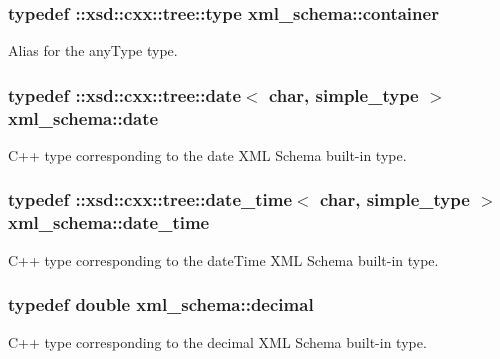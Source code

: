 \subsubsection[{container}]{\setlength{\rightskip}{0pt plus 5cm}typedef \+::xsd\+::cxx\+::tree\+::type {\bf xml\+\_\+schema\+::container}}\label{namespacexml__schema_a395f5179c5fc4643909d66e9ff28d8ca}


Alias for the any\+Type type. 

\hypertarget{namespacexml__schema_ad715e8c0fbf8ec80f67de561627f11bf}{}
\subsubsection[{date}]{\setlength{\rightskip}{0pt plus 5cm}typedef \+::xsd\+::cxx\+::tree\+::date$<$ char, {\bf simple\+\_\+type} $>$ {\bf xml\+\_\+schema\+::date}}\label{namespacexml__schema_ad715e8c0fbf8ec80f67de561627f11bf}


C++ type corresponding to the date X\+M\+L Schema built-\/in type. 

\hypertarget{namespacexml__schema_a4e3e937826b835b568d6a97bdaaf0804}{}
\subsubsection[{date\+\_\+time}]{\setlength{\rightskip}{0pt plus 5cm}typedef \+::xsd\+::cxx\+::tree\+::date\+\_\+time$<$ char, {\bf simple\+\_\+type} $>$ {\bf xml\+\_\+schema\+::date\+\_\+time}}\label{namespacexml__schema_a4e3e937826b835b568d6a97bdaaf0804}


C++ type corresponding to the date\+Time X\+M\+L Schema built-\/in type. 

\hypertarget{namespacexml__schema_a69bfaf24f63a8c18ebd8e21db6b343df}{}
\subsubsection[{decimal}]{\setlength{\rightskip}{0pt plus 5cm}typedef double {\bf xml\+\_\+schema\+::decimal}}\label{namespacexml__schema_a69bfaf24f63a8c18ebd8e21db6b343df}


C++ type corresponding to the decimal X\+M\+L Schema built-\/in type. 

